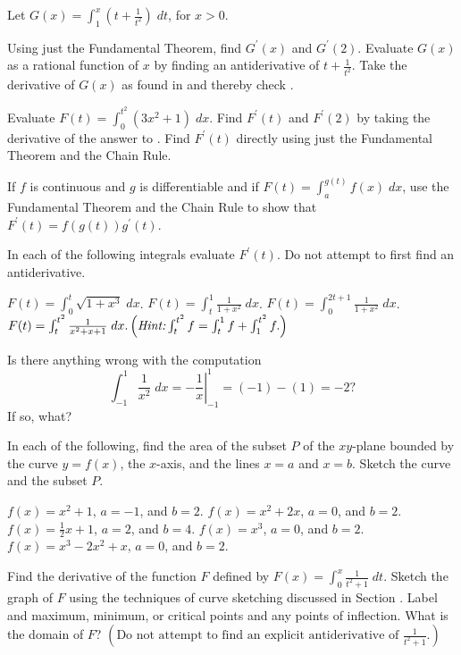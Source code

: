 \begin{exercises}
Let $G(x) = \int_1^x \left( t + \frac1{t^2} \right) \; dt$,
for $x > 0$.
\begin{exenum}
\x
{}
Using just the Fundamental Theorem,
find $G^\prime(x)$ and $G^\prime(2)$.
\x
{}
Evaluate $G(x)$ as a rational function of $x$ by finding
an antiderivative of $t + \frac1{t^2}$.
\x
Take the derivative of $G(x)$ as found in 
and thereby check .
\end{exenum}

\begin{exenum}
\x
{}
Evaluate $F(t) = \int_0^{t^2} (3x^2 + 1) \; dx$.
\x
Find $F^\prime(t)$ and $F^\prime(2)$
by taking the derivative of the answer to .
\x
Find $F^\prime(t)$ directly using just the Fundamental
Theorem and the Chain Rule.
\end{exenum}

If $f$ is continuous and $g$ is differentiable and if
$F(t) = \int_a^{g(t)} f(x) \; dx$, use the Fundamental
Theorem and the Chain Rule to show that
$F^\prime (t) = f(g(t))g^\prime(t)$.

In each of the following integrals evaluate $F^\prime (t)$.
Do not attempt to first find an antiderivative.
\begin{exenum}
\x
$F(t) = \int_0^t \sqrt{1+x^3} \; dx$.
\x
$F(t)  = \int_t^1 \frac1{1+x^2} \; dx$.
\x
$F(t) = \int_0^{2t+1} \frac1{1+x^2} \; dx$.
\x
$F(t) = \int_t^{t^2} \frac1{x^2+x+1} \; dx.
\left(\emph{Hint:} \int_t^{t^2} f = \int_t^1 f + \int_1^{t^2} f. \right)$
\end{exenum}

Is there anything wrong with the computation
\[
\int_{-1}^1 \frac1{x^2} \; dx = 
\left. -\frac1x \right|_{-1}^1 = (-1) - (1) = -2
?
\]
If so, what?

In each of the following, find the area of the subset $P$
of the $xy$-plane bounded by the curve $y=f(x)$,
the $x$-axis, and the lines $x=a$ and $x=b$.
Sketch the curve and the subset $P$.
\begin{exenum}
\x
$f(x) = x^2+1$, $a = -1$, and $b = 2$.
\x
$f(x) = x^2+2x$, $a = 0$, and $b = 2$.
\x
$f(x) = \frac12x+1$, $a = 2$, and $b = 4$.
\x
$f(x) = x^3$, $a = 0$, and $b = 2$.
\x
$f(x) = x^3-2x^2+x$, $a = 0$, and $b = 2$.
\end{exenum}

Find the derivative of the function $F$ defined by
$F(x) = \int_0^x \frac1{t^2+1} \; dt$.
Sketch the graph of $F$ using the techniques of curve
sketching discussed in Section .
Label and maximum, minimum, or critical points
and any points of inflection.
What is the domain of $F$?
$\left( \mbox{Do not attempt to find an explicit 
antiderivative of $\frac1{t^2+1}$.} \right)$

\end{exercises}
